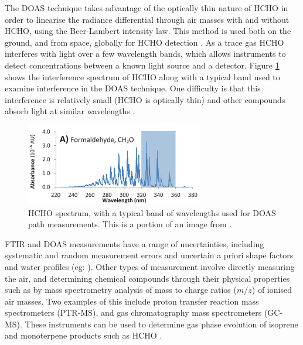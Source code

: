     The DOAS technique takes advantage of the optically thin nature of HCHO in order to linearise the radiance differential through air masses with and without HCHO, using the Beer-Lambert intensity law.
    This method is used both on the ground, and from space, globally for HCHO detection \parencite{Guenther1995, Abad2015, Davenport2015}.
    As a trace gas HCHO interferes with light over a few wavelength bands, which allows instruments to detect concentrations between a known light source and a detector.
    Figure \ref{LR:HCHO:Measurements:fig_HCHOSpectrum} shows the interference spectrum of HCHO along with a typical band used to examine interference in the DOAS technique.
    One difficulty is that this interference is relatively small (HCHO is optically thin) and other compounds absorb light at similar wavelengths \parencite{Davenport2015}.
    
    \begin{figure}
      \includegraphics{Figures/HCHO/HCHOAbsorbanceDavenport.png}
      \caption{ %
        HCHO spectrum, with a typical band of wavelengths used for DOAS path measurements.
        This is a portion of an image from \textcite{Davenport2015}.}
      \label{LR:HCHO:Measurements:fig_HCHOSpectrum}
    \end{figure}
    
    FTIR and DOAS measurements have a range of uncertainties, including systematic and random measurement errors and uncertain a priori shape factors and water profiles (eg: \textcite{Franco2015}).
    Other types of measurement involve directly measuring the air, and determining chemical compounds through their physical properties such as by mass spectrometry analysis of mass to charge ratios ($m/z$) of ionised air masses.
    Two examples of this include proton transfer reaction mass spectrometers (PTR-MS), and gas chromatography mass spectrometers (GC-MS).
    These instruments can be used to determine gas phase evolution of isoprene and monoterpene products such as HCHO \parencite[eg.][]{Lee2006a,Nguyen2014,Wolfe2016,Lerner2017}.
        
